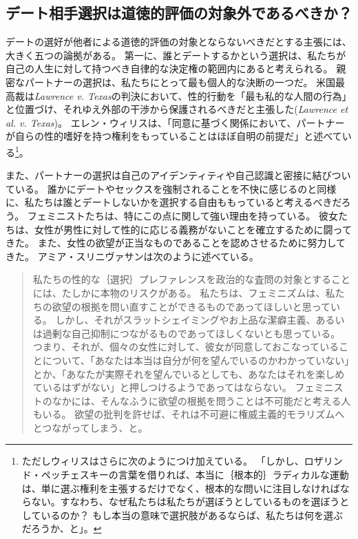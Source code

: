 \documentclass[paper=a4,book,openany]{jlreq}
\begin{document}
\subsection{デート相手選択は道徳的評価の対象外であるべきか？}

デートの選好が他者による道徳的評価の対象とならないべきだとする主張には、大きく五つの論拠がある。
第一に、誰とデートするかという選択は、私たちが自己の人生に対して持つべき自律的な決定権の範囲内にあると考えられる。
親密なパートナーの選択は、私たちにとって最も個人的な決断の一つだ。
米国最高裁は\emph{Lawrence v. Texas}の判決において、性的行動を「最も私的な人間の行為」と位置づけ、それゆえ外部の干渉から保護されるべきだと主張した(\emph{Lawrence et al. v. Texas})。
エレン・ウィリスは、「同意に基づく関係において、パートナーが自らの性的嗜好を持つ権利をもっていることはほぼ自明の前提だ」と述べている\footnote{ただしウィリスはさらに次のようにつけ加えている。
  「しかし、ロザリンド・ペッチェスキーの言葉を借りれば、本当に｛根本的｝{ラディカル}な運動は、単に選ぶ権利を主張するだけでなく、根本的な問いに注目しなければならない。すなわち、なぜ私たちは私たちが選ぼうとしているものを選ぼうとしているのか？ もし本当の意味で選択肢があるならば、私たちは何を選ぶだろうか、と」。
}\citep[p.14]{willis92:_no_more_nice_girls}。

また、パートナーの選択は自己のアイデンティティや自己認識と密接に結びついている。
誰かにデートやセックスを強制されることを不快に感じるのと同様に、私たちは誰とデートしないかを選択する自由ももっていると考えるべきだろう。
フェミニストたちは、特にこの点に関して強い理由を持っている。
彼女たちは、女性が男性に対して性的に応じる義務がないことを確立するために闘ってきた。
また、女性の欲望が正当なものであることを認めさせるために努力してきた。
アミア・スリニヴァサンは次のように述べている。

\begin{quote}
私たちの性的な｛選択｝{プレファレンス}を政治的な査問の対象とすることには、たしかに本物のリスクがある。
私たちは、フェミニズムは、私たちの欲望の根拠を問い直すことができるものであってほしいと思っている。
しかし、それがスラットシェイミングやお上品な潔癖主義、あるいは過剰な自己抑制につながるものであってほしくないとも思っている。
つまり、それが、個々の女性に対して、彼女が同意しておこなっていることについて、「あなたは本当は自分が何を望んでいるのかわかっていない」とか、「あなたが実際それを望んでいるとしても、あなたはそれを楽しめているはずがない」と押しつけるようであってはならない。
フェミニストのなかには、そんなふうに欲望の根拠を問うことは不可能だと考える人もいる。
欲望の批判を許せば、それは不可避に権威主義的モラリズムへとつながってしまう、と。
\citep{srinivasan18:_does_anyon_have_right_sex}
\end{quote}
\end{document}
